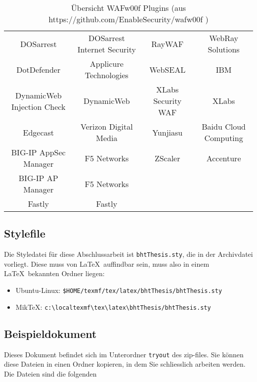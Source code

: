 \begin{table}[h]
\begin{tabular}{|c | c | c | c |}
      DOSarrest & DOSarrest Internet Security &   RayWAF                          & WebRay Solutions\\
      DotDefender & Applicure Technologies &   WebSEAL                         & IBM\\
      DynamicWeb Injection Check & DynamicWeb &   XLabs Security WAF              & XLabs\\
      Edgecast & Verizon Digital Media &   Yunjiasu                        & Baidu Cloud Computing\\
      BIG-IP AppSec Manager & F5 Networks &   ZScaler                         & Accenture\\
      BIG-IP AP Manager & F5 Networks\\
      Fastly & Fastly\\
      \hline
      
      
\end{tabular}
    \caption{Übersicht WAFw00f Plugins (aus https://github.com/EnableSecurity/wafw00f ) }
    \label{tab:my_label}
\end{table}


\subsection*{Stylefile}
Die  Styledatei für diese  Abschlussarbeit ist  \texttt{bhtThesis.sty}, die  in der
Archivdatei vorliegt.  Diese muss von \LaTeX\  auffindbar sein, muss  also in einem
\LaTeX\ bekannten Ordner liegen:
\begin{itemize}
\item Ubuntu-Linux: \verb|$HOME/texmf/tex/latex/bhtThesis/bhtThesis.sty|
\item MikTeX: \verb|c:\localtexmf\tex\latex\bhtThesis/bhtThesis.sty|
\end{itemize}


\subsection*{Beispieldokument}
Dieses  Dokument befindet sich  im Unterordner  \texttt{tryout} des  zip-files. Sie
können diese  Dateien in  einen Ordner kopieren,  in dem Sie  schliesslich arbeiten
werden. Die Dateien sind die folgenden

